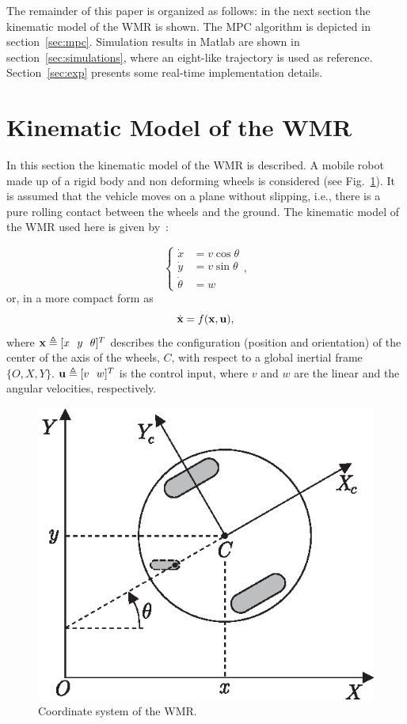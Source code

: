 \documentclass[conference]{IEEEtran} %
\begin{document}
The remainder of this paper is organized as follows: in the next section the
kinematic model of the WMR is shown. The MPC algorithm is depicted in
section~\ref{sec:mpc}. Simulation results in {\sc Matlab} are shown in
section~\ref{sec:simulations}, where an eight-like trajectory is used as
reference. Section~\ref{sec:exp} presents some real-time implementation
details.


\section{Kinematic Model of the WMR}
\label{sec:model}

In this section the kinematic model of the WMR is described. A mobile robot
made up of a rigid body and non deforming wheels is considered (see
Fig.~\ref{fig:robot}). It is assumed that the vehicle moves on a plane
without slipping, i.e., there is a pure rolling contact between the wheels
and the ground. The kinematic model of the WMR used here is given
by~\cite{Campion:TRA-12-1}:

\begin{equation}
\label{eqn:model}
	\left\{
		\begin{aligned}
			\dot x	  &= v\cos\theta \\
			\dot y	  &= v\sin\theta \\
			\dot \theta &= w
		\end{aligned}
	\right.,
\end{equation}
or, in a more compact form as
\begin{equation}
\label{eqn:modelshort}
	\dot{\bf x} = f({\bf x},{\bf u}),	
\end{equation}
\noindent where ${\bf x}\triangleq[x~~y~~\theta]^T$ describes the
configuration (position and orientation) of the center of the axis of the
wheels, $C$, with respect to a global inertial frame $\{O,X,Y\}$.
${\bf u}\triangleq[v~~w]^T$ is the control input, where $v$ and $w$ are the
linear and the angular velocities, respectively.

\begin{figure}[htbp]
	\centering
	\includegraphics[width=0.67\linewidth]{Figures/robot.eps}
	\caption{Coordinate system of the WMR.}
	\label{fig:robot}
\end{figure}
\end{document}
